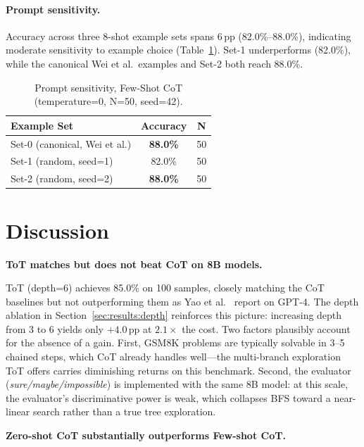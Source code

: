 ﻿\documentclass[runningheads]{llncs}
\begin{document}
\paragraph{Prompt sensitivity.}
Accuracy across three 8-shot example sets spans 6\,pp (82.0\%--88.0\%),
indicating moderate sensitivity to example choice (Table~\ref{tab:prompt}).
Set-1 underperforms (82.0\%), while the canonical Wei et al.\ examples
and Set-2 both reach 88.0\%.

\begin{table}[H]
\centering
\caption{Prompt sensitivity, Few-Shot CoT (temperature=0, N=50, seed=42).}
\label{tab:prompt}
\begin{tabular}{@{}lcc@{}}
\toprule
\textbf{Example Set} & \textbf{Accuracy} & \textbf{N} \\
\midrule
Set-0 (canonical, Wei et al.) & \textbf{88.0\%} & 50 \\
Set-1 (random, seed=1)        & 82.0\%          & 50 \\
Set-2 (random, seed=2)        & \textbf{88.0\%} & 50 \\
\bottomrule
\end{tabular}
\end{table}

\section{Discussion}
\label{sec:discussion}

\medskip\noindent\textbf{ToT matches but does not beat CoT on 8B models.}

ToT (depth=6) achieves 85.0\% on 100 samples, closely matching the CoT
baselines but not outperforming them as Yao et
al.~\cite{yao2023tot} report on GPT-4.
The depth ablation in Section~\ref{sec:results:depth} reinforces
this picture: increasing depth from 3 to 6 yields only $+4.0$\,pp at
$2.1\times$ the cost.
Two factors plausibly account for the absence of a gain.
First, GSM8K problems are typically solvable in 3--5 chained steps,
which CoT already handles well---the multi-branch exploration ToT
offers carries diminishing returns on this benchmark.
Second, the evaluator (\textit{sure/maybe/impossible}) is implemented
with the same 8B model: at this scale, the evaluator's discriminative
power is weak, which collapses BFS toward a near-linear search rather
than a true tree exploration.

\medskip\noindent\textbf{Zero-shot CoT substantially outperforms Few-shot CoT.}
\end{document}
